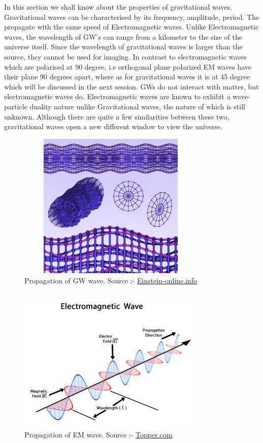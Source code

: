 In this section we shall know about the properties of gravitational waves. Gravitational waves can be characterised by its frequency, amplitude, period. The propagate with the same speed of Electromagnetic waves. Unlike Electromagnetic waves, the wavelength of GW’s can range from a kilometer to the size of the universe itself. Since the wavelength of gravitational waves is larger than the source, they cannot be used for imaging. In contrast to electromagnetic waves which are polarised at 90 degree, i.e orthogonal plane polarized EM waves have their plane 90 degrees apart, where as for gravitational waves it is at 45 degree which will be discussed in the next session. GWs do not interact with matter, but electromagnetic waves do. Electromagnetic waves are known to exhibit a wave-particle duality nature unlike Gravitational waves, the nature of which is still unknown. Although there are quite a few similarities between these two, gravitational waves open a new different window to view the universe. \cite{Thorne:1995xs}

\begin{figure}[h]
    \centering
    \includegraphics[height= 7cm, width=9cm]{images.tex/GW_propagation.jpg}
    \caption{Propagation of GW wave. Source :- \href{https://www.einstein-online.info/en/spotlights/gravwav/gravwav-sub01/}{Einstein-online.info}}
\end{figure}

\begin{figure}[h]
    \centering
    \includegraphics[height= 7cm, width=9cm]{images.tex/EM_propagation.png}
    \caption{Propagation of EM wave. Source :-\; \href{https://www.toppr.com/guides/physics/communication-systems/propagation-of-electromagnetic-waves/}{Topper.com}}
\end{figure}

\pagebreak
